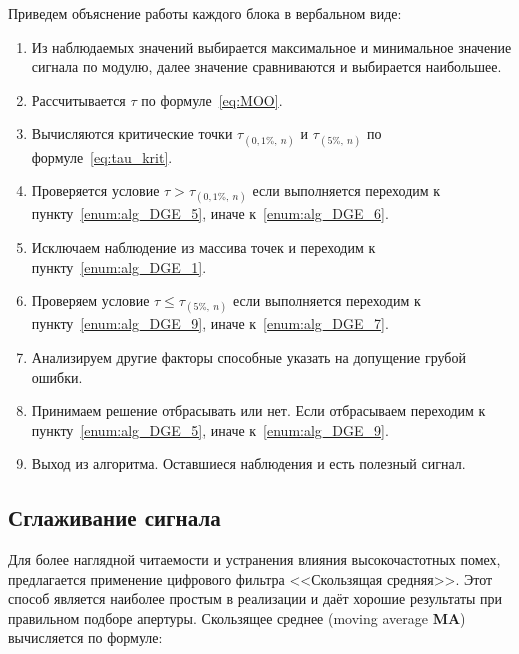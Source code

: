 Приведем объяснение работы каждого блока в вербальном виде:
\begin{enumerate}
	\item Из наблюдаемых значений выбирается максимальное и минимальное значение сигнала по модулю, далее значение сравниваются и выбирается наибольшее.\label{enum:alg_DGE_1}
	\item Рассчитывается $ \tau $ по формуле~\ref{eq:MOO}.
	\item Вычисляются критические точки $ \tau_{(0,1\%,\ n)} $ и $ \tau_{(5\%,\ n)} $ по формуле~\ref{eq:tau_krit}.
	\item Проверяется условие $ \tau > \tau_{(0,1\%,\ n)} $ если выполняется переходим к пункту~\ref{enum:alg_DGE_5}, иначе к~\ref{enum:alg_DGE_6}.
	\item Исключаем наблюдение из массива точек и переходим к пункту~\ref{enum:alg_DGE_1}.\label{enum:alg_DGE_5}
	\item Проверяем условие $ \tau \leqslant \tau_{(5\%,\ n)} $ если выполняется переходим к пункту~\ref{enum:alg_DGE_9}, иначе к~\ref{enum:alg_DGE_7}.\label{enum:alg_DGE_6}
	\item Анализируем другие факторы способные указать на допущение грубой ошибки.\label{enum:alg_DGE_7}
	\item Принимаем решение отбрасывать или нет. Если отбрасываем переходим к пункту~\ref{enum:alg_DGE_5}, иначе к~\ref{enum:alg_DGE_9}.\label{enum:alg_DGE_8}
	\item Выход из алгоритма. Оставшиеся наблюдения и есть полезный сигнал.\label{enum:alg_DGE_9}
\end{enumerate}

\subsection{Сглаживание сигнала}

Для более наглядной читаемости и устранения влияния высокочастотных помех, предлагается применение цифрового фильтра <<Скользящая средняя>>. Этот способ является наиболее простым в реализации и даёт хорошие результаты при правильном подборе апертуры. Скользящее среднее (moving average \textbf{MA}) вычисляется по формуле:

